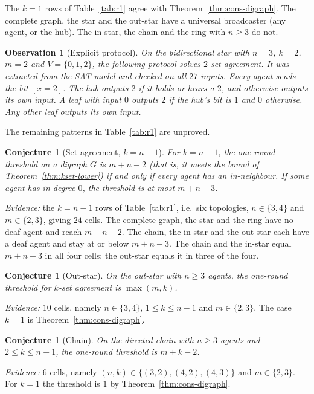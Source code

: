 \documentclass[11pt]{article}
\newtheorem{observation}[theorem]{Observation}
\newtheorem{conjecture}[theorem]{Conjecture}
\begin{document}
The $k=1$ rows of Table~\ref{tab:r1} agree with Theorem~\ref{thm:cons-digraph}. The complete graph, the star and the out-star have a universal broadcaster (any agent, or the hub). The in-star, the chain and the ring with $n\ge3$ do not.

\begin{observation}[Explicit protocol]\label{obs:star-protocol}
On the bidirectional star with $n=3$, $k=2$, $m=2$ and $V=\{0,1,2\}$, the following protocol solves $2$-set agreement. It was extracted from the SAT model and checked on all $27$ inputs. Every agent sends the bit $[x=2]$. The hub outputs $2$ if it holds or hears a $2$, and otherwise outputs its own input. A leaf with input $0$ outputs $2$ if the hub's bit is $1$ and $0$ otherwise. Any other leaf outputs its own input.
\end{observation}

The remaining patterns in Table~\ref{tab:r1} are unproved.

\begin{conjecture}[Set agreement, $k=n-1$]\label{conj:setagree}
For $k=n-1$, the one-round threshold on a digraph $G$ is $m+n-2$ (that is, it meets the bound of Theorem~\ref{thm:kset-lower}) if and only if every agent has an in-neighbour. If some agent has in-degree $0$, the threshold is at most $m+n-3$.
\end{conjecture}
\noindent\emph{Evidence:} the $k=n-1$ rows of Table~\ref{tab:r1}, i.e.\ six topologies, $n\in\{3,4\}$ and $m\in\{2,3\}$, giving $24$ cells. The complete graph, the star and the ring have no deaf agent and reach $m+n-2$. The chain, the in-star and the out-star each have a deaf agent and stay at or below $m+n-3$. The chain and the in-star equal $m+n-3$ in all four cells; the out-star equals it in three of the four.

\begin{conjecture}[Out-star]\label{conj:outstar}
On the out-star with $n\ge3$ agents, the one-round threshold for $k$-set agreement is $\max(m,k)$.
\end{conjecture}
\noindent\emph{Evidence:} $10$ cells, namely $n\in\{3,4\}$, $1\le k\le n-1$ and $m\in\{2,3\}$. The case $k=1$ is Theorem~\ref{thm:cons-digraph}.

\begin{conjecture}[Chain]\label{conj:chain}
On the directed chain with $n\ge3$ agents and $2\le k\le n-1$, the one-round threshold is $m+k-2$.
\end{conjecture}
\noindent\emph{Evidence:} $6$ cells, namely $(n,k)\in\{(3,2),(4,2),(4,3)\}$ and $m\in\{2,3\}$. For $k=1$ the threshold is $1$ by Theorem~\ref{thm:cons-digraph}.
\end{document}
